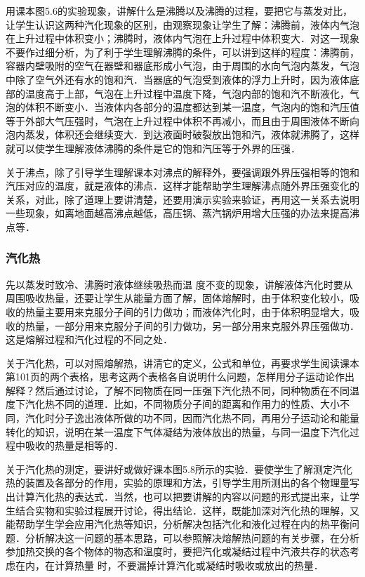 用课本图5.6的实验现象，讲解什么是沸腾以及沸腾的过程，要把它与蒸发对比，让学生认识这两种汽化现象的区别，由观察现象让学生了解：沸腾前，液体内气泡在上升过程中体积变小；沸腾时，液体内气泡在上升过程中体积变大．对这一现象不要作过细分析，为了利于学生理解沸腾的条件，可以讲到这样的程度：沸腾前，容器内壁吸附的空气在器壁和器底形成小气泡，由于周围的水向气泡内蒸发，气泡中除了空气外还有水的饱和汽．当器底的气泡受到液体的浮力上升时，因为液体底部的温度高于上部，气泡在上升过程中温度下降，气泡内部的饱和汽不断液化，气泡的体积不断变小．当液体内各部分的温度都达到某一温度，气泡内的饱和汽压值等于外部大气压强时，气泡在上升过程中体积不再减小，而且由于周围液体不断向泡内蒸发，体积还会继续变大．到达液面时破裂放出饱和汽，液体就沸腾了，这样就可以使学生理解液体沸腾的条件是它的饱和汽压等于外界的压强．

关于沸点，除了引导学生理解课本对沸点的解释外，要强调跟外界压强相等的饱和汽压对应的温度，就是液体的沸点．这样才能帮助学生理解沸点随外界压强变化的关系，对此，除了道理上要讲清楚，还要用演示实验来验证，再用这一关系去说明一些现象，如离地面越高沸点越低，高压锅、蒸汽锅炉用增大压强的办法来提高沸点等．

\subsubsection{汽化热} 

先以蒸发时致冷、沸腾时液体继续吸热而温
度不变的现象，讲解液体汽化时要从周围吸收热量，还要让学生从能量方面了解，固体熔解时，由于体积变化较小，吸收的热量主要用来克服分子间的引力做功；而液体汽化时，由于体积明显增大，吸收的热量，一部分用来克服分子间的引力做功，另一部分用来克服外界压强做功．这是熔解过程和汽化过程的不同之处．

关于汽化热，可以对照熔解热，讲清它的定义，公式和单位，再要求学生阅读课本第101页的两个表格，思考这两个表格各自说明什么问题，怎样用分子运动论作出解释？然后通过讨论，了解不同物质在同一压强下汽化热不同，同种物质在不同温度下汽化热不同的道理．比如，不同物质分子间的距离和作用力的性质、大小不同，汽化时分子逸出液体所做的功不同，因而汽化热不同，再用分子运动论和能量转化的知识，说明在某一温度下气体凝结为液体放出的热量，与同一温度下汽化过程中吸收的热量是相等的．

关于汽化热的测定，要讲好或做好课本图5.8所示的实验．要使学生了解测定汽化热的装置及各部分的作用，实验的原理和方法，引导学生用所测出的各个物理量写出计算汽化热的表达式．当然，也可以把要讲解的内容以问题的形式提出来，让学生结合实物和实验过程展开讨论，得出结论．这样，既能加深对汽化热的理解，又能帮助学生学会应用汽化热等知识，分析解决包括汽化和液化过程在内的热平衡问题．分析解决这一问题的基本思路，可以参照解决熔解热问题的有关步骤，在分析参加热交换的各个物体的物态和温度时，要把汽化或凝结过程中汽液共存的状态考虑在内，在计算热量
时，不要漏掉计算汽化或凝结时吸收或放出的热量．

